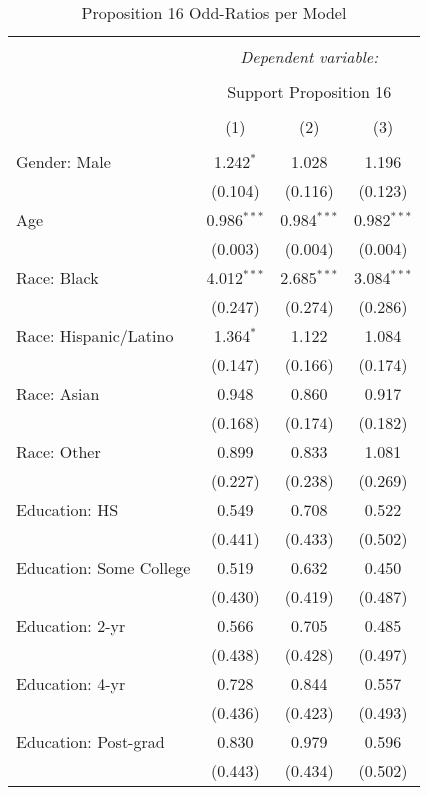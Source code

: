 
\begin{table}[!htbp] \centering 
  \caption{Proposition 16 Odd-Ratios per Model} 
  \label{} 
\footnotesize 
\begin{tabular}{@{\extracolsep{5pt}}lccc} 
\\[-1.8ex]\hline 
\hline \\[-1.8ex] 
 & \multicolumn{3}{c}{\textit{Dependent variable:}} \\ 
\cline{2-4} 
\\[-1.8ex] & \multicolumn{3}{c}{Support Proposition 16} \\ 
\\[-1.8ex] & (1) & (2) & (3)\\ 
\hline \\[-1.8ex] 
 Gender: Male & 1.242$^{*}$ & 1.028 & 1.196 \\ 
  & (0.104) & (0.116) & (0.123) \\ 
  Age & 0.986$^{***}$ & 0.984$^{***}$ & 0.982$^{***}$ \\ 
  & (0.003) & (0.004) & (0.004) \\ 
  Race: Black & 4.012$^{***}$ & 2.685$^{***}$ & 3.084$^{***}$ \\ 
  & (0.247) & (0.274) & (0.286) \\ 
  Race: Hispanic/Latino & 1.364$^{*}$ & 1.122 & 1.084 \\ 
  & (0.147) & (0.166) & (0.174) \\ 
  Race: Asian & 0.948 & 0.860 & 0.917 \\ 
  & (0.168) & (0.174) & (0.182) \\ 
  Race: Other & 0.899 & 0.833 & 1.081 \\ 
  & (0.227) & (0.238) & (0.269) \\ 
  Education: HS & 0.549 & 0.708 & 0.522 \\ 
  & (0.441) & (0.433) & (0.502) \\ 
  Education: Some College & 0.519 & 0.632 & 0.450 \\ 
  & (0.430) & (0.419) & (0.487) \\ 
  Education: 2-yr & 0.566 & 0.705 & 0.485 \\ 
  & (0.438) & (0.428) & (0.497) \\ 
  Education: 4-yr & 0.728 & 0.844 & 0.557 \\ 
  & (0.436) & (0.423) & (0.493) \\ 
  Education: Post-grad & 0.830 & 0.979 & 0.596 \\ 
  & (0.443) & (0.434) & (0.502) \\ 

\end{tabular}
\end{table}

